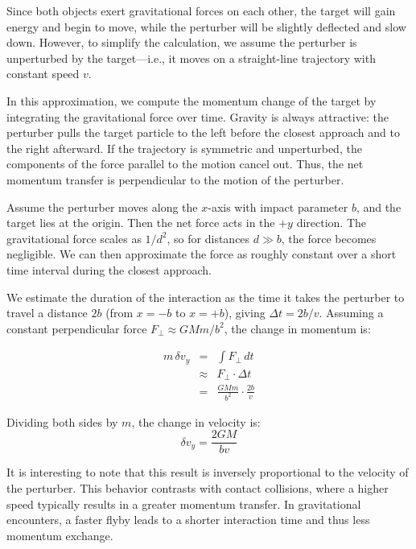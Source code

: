         Since both objects exert gravitational forces on each other, the target will gain energy and begin to move, while the perturber will be slightly deflected and slow down. However, to simplify the calculation, we assume the perturber is unperturbed by the target—i.e., it moves on a straight-line trajectory with constant speed $v$.

        In this approximation, we compute the momentum change of the target by integrating the gravitational force over time. Gravity is always attractive: the perturber pulls the target particle to the left before the closest approach and to the right afterward. If the trajectory is symmetric and unperturbed, the components of the force parallel to the motion cancel out. Thus, the net momentum transfer is perpendicular to the motion of the perturber.

        Assume the perturber moves along the $x$-axis with impact parameter $b$, and the target lies at the origin. Then the net force acts in the $+y$ direction. The gravitational force scales as $1/d^2$, so for distances $d \gg b$, the force becomes negligible. We can then approximate the force as roughly constant over a short time interval during the closest approach.

        We estimate the duration of the interaction as the time it takes the perturber to travel a distance $2b$ (from $x = -b$ to $x = +b$), giving $\Delta t = 2b/v$. Assuming a constant perpendicular force $F_\perp \approx GMm/b^2$, the change in momentum is:

        \begin{eqnarray}
        m\,\delta v_y &=& \int F_\perp \, dt \\
                    &\approx& F_\perp \cdot \Delta t \\
                    &=& \frac{GMm}{b^2} \cdot \frac{2b}{v}
        \end{eqnarray}

        Dividing both sides by $m$, the change in velocity is:
        \begin{equation}
        \delta v_y = \frac{2GM}{b v}
        \end{equation}

        It is interesting to note that this result is inversely proportional to the velocity of the perturber. This behavior contrasts with contact collisions, where a higher speed typically results in a greater momentum transfer. In gravitational encounters, a faster flyby leads to a shorter interaction time and thus less momentum exchange.

